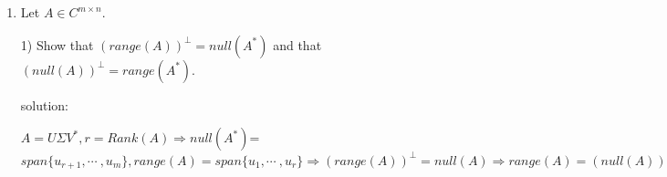 \documentclass{article}
\begin{document}
\begin{enumerate}
		$\parallel A-QB \parallel _F^2
		=trace((A-BQ)^T(A-QB))
		=trace((A^T-B^T Q^T)(A-QB))
		=trace(A^T A+B^T Q^T Q B -A^T QB-B^T Q^T A)
		=trace(A^T A+B^T B)-2trace(A^T QB)$
		
		$trace(A^T A+B^T B)$ is constant.
		
		so,the $Q$ that minimizes $\parallel A - QB \parallel_F$ over all choices of orthogonal $Q$ also maximizes $trace(A^TQB)$
		
		2) Suppose that the $SVD$ of the $m \times m$ matrix $BA^T$ is $U\Sigma V^T$, where $U$ and $V$ are $m \times m$ and orthogonal and $\Sigma$ is diagonal with diagonal entries $\sigma_1 \ge ... \ge \sigma_m \ge 0$. Define $Z = V^TQU$. Use these definitions and $(i)$ to show that
		\[trace(A^TQB) = trace(Z\Sigma) \le \sum_{i=1}^{m}{\sigma_i}\].
		
		solution:$ $
		
		$trace(A^T QB)=trace(QB A^T)=trace(QU \Sigma V^T)=trace(V^T QU\Sigma )=trace(Z\Sigma )$
		
		Z is orthogonal and diagonal,hence $z_{ij}$=0 or 1 or -1,
		\label{{\tiny key}}
		$trace(Z\Sigma )= \sum \limits_i z_{ii} \sigma _i \leq \sum \limits_i \sigma _i$
		
		3) Identify the choice of $Q$ that gives equality in the bound of $(ii)$.
		
		solution:$ $
		
		if $Q=VU^T$,
		
		$Z=V^TQU=V^TVU^TU=V^{-1}VU^{-1}U=II=I$
		
		$trace(Z\Sigma )=trace(\Sigma )=\sum \limits_i \sigma _i$
		
		4) Carefully state a theorem summarizing the solution to the minimization of $\parallel A - QB \parallel_F$.
		
		solution:$ $
		
		$Q=VU^T,Q^T=Q^{-1},\parallel A - QB \parallel_F$ is minimized by Q $\Rightarrow$ 
		$BA^T=U \Sigma V^T$is an SVD.
		
		\item
		Let $A \in C^{m \times n}$.
		
		1) Show that $(range(A))^\perp = null(A^*)$ and that $(null(A))^\perp = range(A^*)$.
		
		solution:$ $
		
		$A=U  \Sigma V^*
		,r=Rank(A)
		\Rightarrow null(A^*)
		$=$span\{u_{r+1},\cdots\ ,u_m\},range(A)=span\{u_1,\cdots\ ,u_r\}
		\Rightarrow ( range(A) )^\perp =null(A)
		\Rightarrow range(A)=(null(A))^\perp $
		

\end{enumerate}
\end{document}
